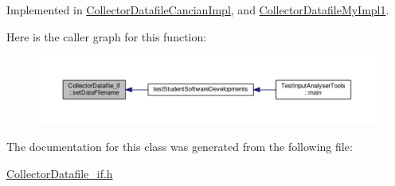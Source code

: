 Implemented in \hyperlink{class_collector_datafile_cancian_impl_a7fb058367bd603743d3636c39c44ca56}{Collector\-Datafile\-Cancian\-Impl}, and \hyperlink{class_collector_datafile_my_impl1_ac4c401ae3cf4ccc723b6b9efa614ccd1}{Collector\-Datafile\-My\-Impl1}.



Here is the caller graph for this function\-:
\nopagebreak
\begin{figure}[H]
\begin{center}
\leavevmode
\includegraphics[width=350pt]{class_collector_datafile__if_ab826bbf5472a5cfdbf2f2c30273da8eb_icgraph}
\end{center}
\end{figure}




The documentation for this class was generated from the following file\-:\begin{DoxyCompactItemize}
\item 
\hyperlink{_collector_datafile__if_8h}{Collector\-Datafile\-\_\-if.\-h}\end{DoxyCompactItemize}
